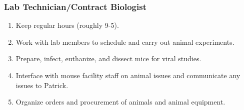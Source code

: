 \documentclass[10pt, letterpaper, twocolumn]{article} %
\begin{document}
\subsubsection{Lab Technician/Contract Biologist}
\begin{enumerate}
\item Keep regular hours (roughly 9-5).
\item Work with lab members to schedule and carry out animal experiments.
\item Prepare, infect, euthanize, and dissect mice for viral studies.
\item Interface with mouse facility staff on animal issues and communicate any issues to Patrick.
\item Organize orders and procurement of animals and animal equipment.
\end{enumerate}
\end{document}
